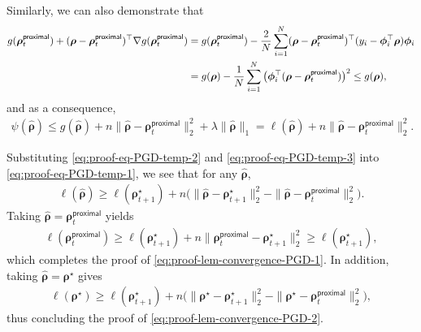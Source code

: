 \documentclass[english]{article}
\begin{document}
Similarly, we can also demonstrate that
%
\begin{align*}
g({\bm \rho}_t^{\mathsf{proximal}}) + ({\bm \rho} - {\bm \rho}_t^{\mathsf{proximal}})^{\top}\nabla g({\bm \rho}_t^{\mathsf{proximal}}) 
&= g({\bm \rho}_t^{\mathsf{proximal}}) - \frac2N\sum_{i=1}^N({\bm \rho} - {\bm \rho}_t^{\mathsf{proximal}})^{\top}(y_i - {\bm \phi}_i^{\top}{\bm \rho}){\bm \phi}_i\notag\\
&= g({\bm \rho}) - \frac1N\sum_{i=1}^N\big({\bm \phi}_i^{\top}({\bm \rho} - {\bm \rho}_t^{\mathsf{proximal}})\big)^2 \le g({\bm \rho}),
\end{align*}
and as a consequence, 
\begin{align}\label{eq:proof-eq-PGD-temp-3}
\psi(\widehat{\bm \rho}) \le g(\widehat{\bm \rho}) + n\|\widehat{\bm \rho} - {\bm \rho}_t^{\mathsf{proximal}}\|_2^2 + \lambda\|\widehat{\bm \rho}\|_1 = \ell(\widehat{\bm \rho}) + n\|\widehat{\bm \rho} - {\bm \rho}_t^{\mathsf{proximal}}\|_2^2.
\end{align}
%


Substituting \eqref{eq:proof-eq-PGD-temp-2} and \eqref{eq:proof-eq-PGD-temp-3} into \eqref{eq:proof-eq-PGD-temp-1}, we see that for any $\widehat{\bm \rho}$,
%
\begin{align*}
\ell(\widehat{\bm \rho}) \ge \ell({\bm \rho}_{t+1}^{\star}) + n\big(\|\widehat{\bm \rho} - {\bm \rho}_{t+1}^{\star}\|_2^2 - \|\widehat{\bm \rho} - {\bm \rho}_t^{\mathsf{proximal}}\|_2^2\big).
\end{align*}
%
Taking $\widehat{\bm \rho} = {\bm \rho}_t^{\mathsf{proximal}}$ yields
%
\begin{align*}
\ell({\bm \rho}_t^{\mathsf{proximal}}) \ge \ell({\bm \rho}_{t+1}^{\star}) + n\|{\bm \rho}_t^{\mathsf{proximal}} - {\bm \rho}_{t+1}^{\star}\|_2^2 \ge \ell({\bm \rho}_{t+1}^{\star}), 
\end{align*}
%
which completes the proof of \eqref{eq:proof-lem-convergence-PGD-1}. In addition, taking $\widehat{\bm{\rho}}=\bm{\rho}^{\star}$ gives
%
\begin{align*}
\ell({\bm \rho}^{\star}) \ge \ell({\bm \rho}_{t+1}^{\star}) + n\big(\|{\bm \rho}^{\star} - {\bm \rho}_{t+1}^{\star}\|_2^2 -\|{\bm \rho}^{\star} - {\bm \rho}_t^{\mathsf{proximal}}\|_2^2\big),
\end{align*}
%
thus concluding the proof of \eqref{eq:proof-lem-convergence-PGD-2}.

\end{document}
